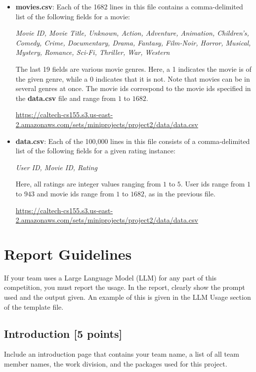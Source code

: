 \begin{itemize}
	\item \textbf{movies.csv}: Each of the 1682 lines in this file contains a comma-delimited list of the following fields for a movie:
		\begin{center}
		\textit{Movie ID, Movie Title, Unknown, Action, Adventure, Animation, Children’s, Comedy, Crime, Documentary, Drama, Fantasy, Film-Noir, Horror, Musical, Mystery, Romance, Sci-Fi, Thriller, War, Western}
		\end{center}

The last 19 fields are various movie genres. Here, a 1 indicates the movie is of the given genre, while a 0 indicates that it is not. Note that movies can be in several genres at once. The movie ids correspond to the movie ids specified in the \textbf{data.csv} file and range from $1$ to $1682$.

    \url{https://caltech-cs155.s3.us-east-2.amazonaws.com/sets/miniprojects/project2/data/data.csv}
	\item \textbf{data.csv}: Each of the 100,000 lines in this file consists of a comma-delimited list of the following fields for a given rating instance:
		\begin{center}
		\textit{User ID, Movie ID, Rating}
		\end{center}
Here, all ratings are integer values ranging from $1$ to $5$. User ids range from $1$ to $943$ and movie ids range from $1$ to $1682$, as in the previous file.

    \url{https://caltech-cs155.s3.us-east-2.amazonaws.com/sets/miniprojects/project2/data/data.csv}
\end{itemize}

\section{Report Guidelines}
If your team uses a Large Language Model (LLM) for any part of this competition, you must report the usage. In the report, clearly show the prompt used and the output given. An example of this is given in the LLM Usage section of the template file.

\subsection{Introduction [5 points]}
Include an introduction page that contains your team name, a list of all team member names, the work division, and the packages used for this project.

